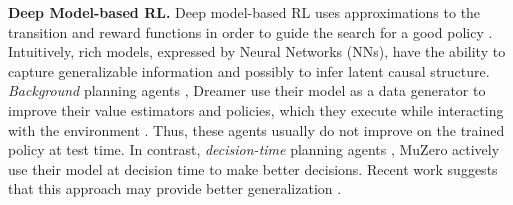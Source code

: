 

\textbf{Deep Model-based RL.}
Deep model-based RL uses approximations to the transition and reward functions in order to guide the search for a good policy \citep{silver2017mastering,schrittwieser2020mastering}. Intuitively, rich models, expressed by Neural Networks (NNs), have the ability to capture generalizable information and possibly to infer latent causal structure. \textit{Background} planning agents \eg{}, Dreamer \citep{hafner2023mastering} use their model as a data generator to improve their value estimators and policies,  which they execute while interacting with the environment \citep{sutton1991dyna}. Thus, these agents usually do not improve on the trained policy at test time.
In contrast, \textit{decision-time} planning agents \eg{}, MuZero \citep{schrittwieser2020mastering} actively use their model at decision time to make better decisions. Recent work suggests that this approach may provide better generalization \citep{alver2022understanding}.


